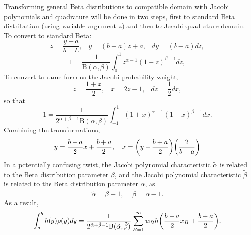 Transforming general Beta distributions to compatible domain with Jacobi polynomials and quadrature will be
done in two steps, first to standard Beta distribution (using variable argument $z$) and then to Jacobi quadrature domain.
To convert to standard Beta:
\begin{equation}
  z=\frac{y-a}{b-L},\hspace{10pt}y=(b-a)z+a,\hspace{10pt} dy=(b-a)dz,
\end{equation}
\begin{equation}
  1=\frac{1}{\text{B}(\alpha,\beta)}\int_0^1 z^{\alpha-1}(1-z)^{\beta-1}dz,
\end{equation}
To convert to same form as the Jacobi probability weight,
\begin{equation}
  z=\frac{1+x}{2},\hspace{10pt}x=2z-1,\hspace{10pt}dz=\frac{1}{2}dx,
\end{equation}
so that
\begin{equation}
  1=\frac{1}{2^{\alpha+\beta-1}\text{B}(\alpha,\beta)}\int_{-1}^1 (1+x)^{\alpha-1}(1-x)^{\beta-1} dx.
\end{equation}
Combining the transformations,
\begin{equation}
  y=\frac{b-a}{2}x+\frac{b+a}{2},\hspace{10pt}x=\qty(y-\frac{b+a}{2})\qty(\frac{2}{b-a})
\end{equation}
In a potentially confusing twist, the Jacobi polynomial characteristic $\tilde\alpha$ is related to the Beta
distribution parameter $\beta$, and the Jacobi polynomial characteristic $\tilde\beta$ is related to the Beta
distribution parameter $\alpha$, as
\begin{equation}
  \tilde\alpha = \beta-1,\hspace{15pt}\tilde\beta = \alpha-1.
\end{equation}
As a result,
\begin{equation}
  \int_a^b h(y)\rho(y)dy = \frac{1}{2^{\tilde\alpha+\tilde\beta-1}\text{B}(\tilde\alpha,\tilde\beta)}
      \sum_{B=1}^\infty w_B h\qty(\frac{b-a}{2}x_B+\frac{b+a}{2}).
\end{equation}




